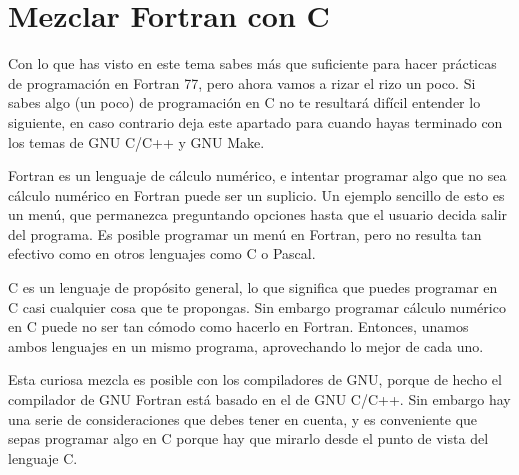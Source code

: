 \section{Mezclar Fortran con C}\label{fortran+c}


Con lo que has visto en este  tema sabes más que suficiente para hacer
prácticas de programación  en Fortran 77, pero ahora vamos  a rizar el
rizo un  poco. Si  sabes algo  (un poco)  de programación  en C  no te
resultará difícil entender  lo siguiente, en caso  contrario deja este
apartado para cuando hayas terminado con  los temas de GNU C/C++ y GNU
Make.

Fortran es un lenguaje de  cálculo numérico, e intentar programar algo
que  no sea  cálculo numérico  en Fortran  puede ser  un suplicio.  Un
ejemplo  sencillo  de esto  es  un  menú, que  permanezca  preguntando
opciones hasta  que el usuario  decida salir del programa.  Es posible
programar un  menú en Fortran,  pero no  resulta tan efectivo  como en
otros lenguajes como C o Pascal.

C es  un lenguaje de  propósito general,  lo que significa  que puedes
programar  en C  casi cualquier  cosa  que te  propongas. Sin  embargo
programar cálculo numérico  en C puede no ser tan  cómodo como hacerlo
en Fortran.  Entonces, unamos  ambos lenguajes  en un  mismo programa,
aprovechando lo mejor de cada uno.

Esta curiosa mezcla es posible con  los compiladores de GNU, porque de
hecho el compilador de GNU Fortran está basado en el de GNU C/C++. Sin
embargo hay una serie de consideraciones  que debes tener en cuenta, y
es conveniente  que sepas programar algo  en C porque hay  que mirarlo
desde el punto de vista del lenguaje C.

